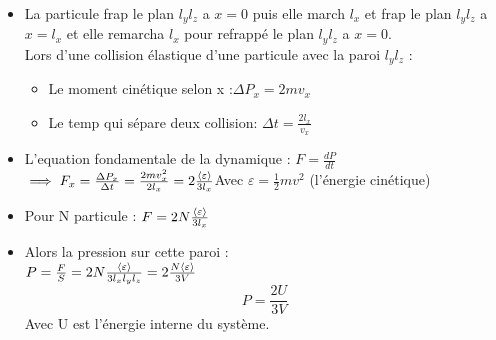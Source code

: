 \documentclass[12pt,oneside]{book}
\begin{document}
\begin{itemize}
    \item La particule frap le plan $l_yl_z$ a $x=0$ puis elle march $l_x$ et frap le plan $l_yl_z$ a $x = l_x$ et elle remarcha $l_x$ pour refrappé le plan $l_yl_z$ a $x=0$.\\
          Lors d'une collision élastique d'une particule avec la paroi $l_y l_z$ :
          \begin{itemize}
              \item Le moment cinétique selon x :$\Delta P_x = 2mv_x$
              \item Le temp qui sépare deux collision: $\Delta t = \frac{2 l_x}{v_x}$
          \end{itemize}
    \item L'equation fondamentale de la dynamique : $F= \frac{dP}{dt}$\\
          $\implies F_x =\frac{\Delta P_x}{\Delta t}=\frac{2mv_x^2}{2l_x} = 2 \frac{\langle \varepsilon \rangle}{3l_x}$Avec $\varepsilon = \frac{1}{2}mv^2$ (l’énergie cinétique)
    \item Pour N particule : $F = 2 N \frac{\langle \varepsilon \rangle}{3l_x}$
    \item Alors la pression sur cette paroi :\\
          $P =\frac{F}{S} = 2N \frac{\langle \varepsilon \rangle}{3l_xl_yl_z} = 2\frac{N\langle \varepsilon \rangle}{3V}$\\
          \[\boxed{P = \frac{2U}{3V}}\]
          Avec U est l’énergie interne du système.
\end{itemize}
\end{document}
